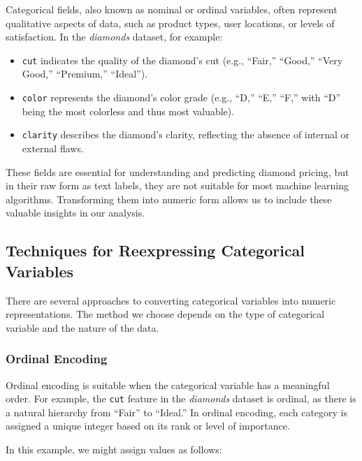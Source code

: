 \documentclass[
]{book}
\newcommand{\passthrough}[1]{#1}
\providecommand{\tightlist}{%
  \setlength{\itemsep}{0pt}\setlength{\parskip}{0pt}}
\theoremstyle{definition}
\theoremstyle{definition}
\theoremstyle{definition}
\theoremstyle{definition}
\theoremstyle{remark}
\begin{document}
Categorical fields, also known as nominal or ordinal variables, often represent qualitative aspects of data, such as product types, user locations, or levels of satisfaction. In the \emph{diamonds} dataset, for example:

\begin{itemize}
\tightlist
\item
  \passthrough{\lstinline!cut!} indicates the quality of the diamond's cut (e.g., ``Fair,'' ``Good,'' ``Very Good,'' ``Premium,'' ``Ideal'').
\item
  \passthrough{\lstinline!color!} represents the diamond's color grade (e.g., ``D,'' ``E,'' ``F,'' with ``D'' being the most colorless and thus most valuable).
\item
  \passthrough{\lstinline!clarity!} describes the diamond's clarity, reflecting the absence of internal or external flaws.
\end{itemize}

These fields are essential for understanding and predicting diamond pricing, but in their raw form as text labels, they are not suitable for most machine learning algorithms. Transforming them into numeric form allows us to include these valuable insights in our analysis.

\subsection{Techniques for Reexpressing Categorical Variables}\label{techniques-for-reexpressing-categorical-variables}

There are several approaches to converting categorical variables into numeric representations. The method we choose depends on the type of categorical variable and the nature of the data.

\subsubsection*{Ordinal Encoding}\label{ordinal-encoding}

Ordinal encoding is suitable when the categorical variable has a meaningful order. For example, the \passthrough{\lstinline!cut!} feature in the \emph{diamonds} dataset is ordinal, as there is a natural hierarchy from ``Fair'' to ``Ideal.'' In ordinal encoding, each category is assigned a unique integer based on its rank or level of importance.

In this example, we might assign values as follows:
\end{document}
